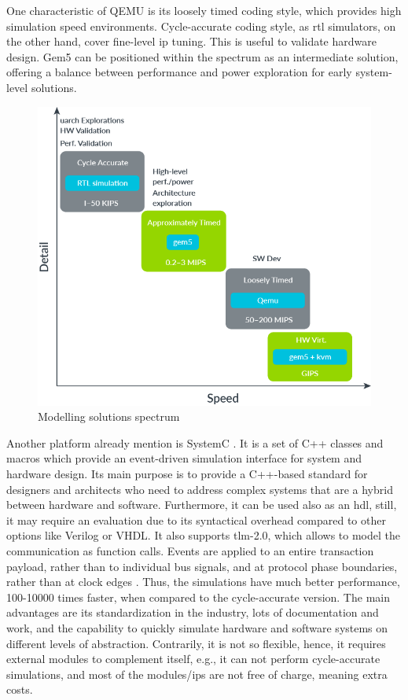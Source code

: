 One characteristic of QEMU is its loosely timed coding style, which provides high simulation speed environments. Cycle-accurate coding style, as \gls{rtl} simulators, on the other hand, cover fine-level \gls{ip} tuning. This is useful to validate hardware design. Gem5 can be positioned within the spectrum as an intermediate solution, offering a balance between performance and power exploration for early system-level solutions.

\begin{figure}[H]
	\centering
 	\includegraphics[width=0.6\linewidth]{Images/SimulationComparation.png}
 	\caption{ Modelling solutions spectrum \cite{herrera2020running}}
	 \label{fig_gem5VSQEMU}
\end{figure}

Another platform already mention is SystemC \cite{systemC}. It is a set of C++ classes and macros which provide an event-driven simulation interface for system and hardware design. Its main purpose is to provide a C++-based standard for designers and architects who need to address complex systems that are a hybrid between hardware and software. Furthermore, it can be used also as an \gls{hdl}, still, it may require an evaluation due to its syntactical overhead compared to other options like Verilog or VHDL. It also supports \gls{tlm}-2.0, which allows to model the communication as function calls. Events are applied to an entire transaction payload, rather than to individual bus signals, and at protocol phase
boundaries, rather than at clock edges \cite{wieman2012overview}. Thus, the simulations have much better performance, 100-10000 times faster, when compared to the cycle-accurate version. The main advantages are its standardization in the industry, lots of documentation and work, and the capability to quickly simulate hardware and software systems on different levels of abstraction. Contrarily, it is not so flexible, hence, it requires external modules to complement itself, e.g., it can not perform cycle-accurate simulations, and most of the modules/\glspl{ip} are not free of charge, meaning extra costs. 


